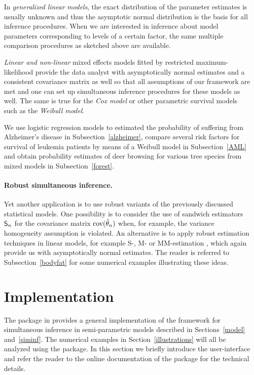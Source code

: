 \documentclass[bimj,fleqn]{w-art}
\begin{document}
In \emph{generalized linear models}, the exact distribution of the parameter
estimates is usually unknown and thus the asymptotic normal distribution is
the basis for all inference procedures. When we are interested in inference
about model parameters corresponding to levels of a certain factor, the same
multiple comparison procedures as sketched above are available. 

\emph{Linear and non-linear} mixed effects models fitted by restricted
maximum-likelihood provide the data analyst with asymptotically normal
estimates and a consistent
covariance matrix as well so that all assumptions of our framework are met
and one can set up simultaneous inference procedures for these models as
well. The same is true for the \emph{Cox model} or other parametric survival
models such as the \emph{Weibull model}.

We use logistic regression models to estimated the probability of suffering
from Alzheimer's disease in Subsection~\ref{alzheimer}, compare several risk
factors for survival of leukemia patients by means of a Weibull model in
Subsection~\ref{AML} and obtain probability estimates of deer browsing for
various tree species from mixed models in Subsection~\ref{forest}.

\paragraph{Robust simultaneous inference.}

Yet another application is to use robust variants of the previously
discussed statistical models. One possibility is to consider the use of
sandwich estimators $\textsf{S}_n$ for the covariance matrix
$\text{cov}(\hat{\theta}_n)$ when,
for example, the variance homogeneity assumption is violated. An alternative
is to apply robust estimation techniques in linear models, for example S-,
M- or MM-estimation 
\citep[see][for
example]{RousseeuwLeroy2003, mfluc:Stefanski+Boos:2002, Yohai1987, mfluc:White:1994}, 
which again provide us with asymptotically normal estimates.
The reader is referred to Subsection~\ref{bodyfat} for some numerical
examples illustrating these ideas.

\section{Implementation}

\label{implementation}

The  package \citep{pkg:multcomp} in \RR{} \citep{rcore2007}
provides a general implementation of the framework for simultaneous
inference in semi-parametric models described in Sections~\ref{model}
and~\ref{siminf}. The numerical examples in Section~\ref{illustrations} will
all be analyzed using the  package. In this section we
briefly introduce the user-interface and refer the reader to
the online documentation of the package for the technical details.
\end{document}
